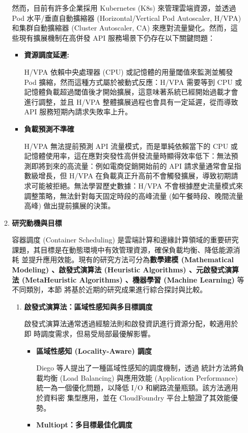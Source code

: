 \documentclass[12pt,a4paper]{article}
\begin{document}
\begin{enumerate}[label={(\zhdig*)}, leftmargin=2\parindent, listparindent=\parindent]
\begin{enumerate}[label={(\arabic*)}, leftmargin=\parindent, listparindent=\parindent]
然而，目前有許多企業採用 Kubernetes (K8s) 來管理雲端資源，並透過 Pod 水平/垂直自動擴縮器 (Horizontal/Vertical Pod Autoscaler, H/VPA) 和集群自動擴縮器 (Cluster Autoscaler, CA) 來應對流量變化。然而，這些現有擴展機制在高併發 API 服務場景下仍存在以下關鍵問題\cite{7}：
\begin{itemize}[leftmargin=\parindent, listparindent=\parindent]
    \item\textbf{資源調度延遲:}

H/VPA 依賴中央處理器 (CPU) 或記憶體的用量閾值來監測並觸發 Pod 擴縮，然而這種方式屬於被動式反應：H/VPA 需要等到 CPU 或記憶體負載超過閾值後才開始擴展，這意味著系統已經開始過載才會進行調整，並且 H/VPA 整體擴展過程也會具有一定延遲，從而導致 API 服務短期內請求失敗率上升。

    \item \textbf{
負載預測不準確
}

H/VPA 無法提前預測 API 流量模式，而是單純依賴當下的 CPU 或記憶體使用率，這在應對突發性高併發流量時顯得效率低下：無法預測即將到來的高流量：例如電商促銷開始前的 API 請求量通常會呈指數級增長，但 H/VPA 在負載真正升高前不會觸發擴展，導致初期請求可能被拒絕。無法學習歷史數據：H/VPA 不會根據歷史流量模式來調整策略，無法針對每天固定時段的高峰流量 (如午餐時段、晚間流量高峰) 做出提前擴展的決策。

    \end{itemize}
    \item \textbf{研究動機與目標}

容器調度 (Container Scheduling) 是雲端計算和邊緣計算領域的重要研究
課題，其目標是在動態環境中有效管理資源，確保負載均衡、降低能源消耗
並提升應用效能。現有的研究方法\cite{11}可分為\textbf{數學建模 (Mathematical
Modeling) 、啟發式演算法 (Heuristic Algorithms) 、元啟發式演算法 (MetaHeuristic Algorithms) 、機器學習 (Machine Learning) }等不同類別，本節
將基於近期的研究成果進行綜合探討與比較。

\begin{enumerate}[label={(\zhdig*)}, leftmargin=\parindent, listparindent=\parindent]

\item \textbf{啟發式演算法：區域性感知與多目標調度}

啟發式演算法通常透過經驗法則和啟發資訊進行資源分配，較適用於即
時調度需求，但易受局部最優解影響。
\begin{itemize}[leftmargin=\parindent, listparindent=\parindent]
    \item \textbf{
        \cite{12} 區域性感知 (Locality-Aware) 調度}

    Diego 等人提出了一種區域性感知的調度機制，透過
    統計方法將負載均衡 (Load Balancing) 與應用效能 (Application Performance)
    統一為一個優化問題，以降低 I/O 和網路流量瓶頸。該方法適用於資料密
    集型應用，並在 CloudFoundry 平台上驗證了其效能優勢。
    \item \textbf{\cite{13} Multiopt：多目標最佳化調度}


\end{itemize}
\end{enumerate}
\end{enumerate}
\end{enumerate}
\end{document}
